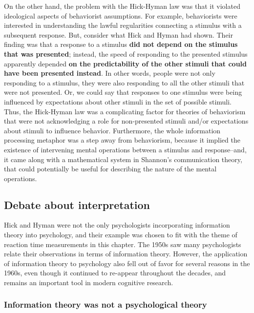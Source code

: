 \documentclass[
  oneside,
  12pt]{crumpbook}
\begin{document}
On the other hand, the problem with the Hick-Hyman law was that it violated ideological aspects of behaviorist assumptions. For example, behaviorists were interested in understanding the lawful regularities connecting a stimulus with a subsequent response. But, consider what Hick and Hyman had shown. Their finding was that a response to a stimulus \textbf{did not depend on the stimulus that was presented}; instead, the speed of responding to the presented stimulus apparently depended \textbf{on the predictability of the other stimuli that could have been presented instead}. In other words, people were not only responding to a stimulus, they were also responding to all the other stimuli that were not presented. Or, we could say that responses to one stimulus were being influenced by expectations about other stimuli in the set of possible stimuli. Thus, the Hick-Hyman law was a complicating factor for theories of behaviorism that were not acknowledging a role for non-presented stimuli and/or expectations about stimuli to influence behavior. Furthermore, the whole information processing metaphor was a step away from behaviorism, because it implied the existence of intervening mental operations between a stimulus and response--and, it came along with a mathematical system in Shannon's communication theory, that could potentially be useful for describing the nature of the mental operations.

\hypertarget{debate-about-interpretation}{%
\subsection{Debate about interpretation}\label{debate-about-interpretation}}

Hick and Hyman were not the only psychologists incorporating information theory into psychology, and their example was chosen to fit with the theme of reaction time measurements in this chapter. The 1950s saw many psychologists relate their observations in terms of information theory. However, the application of information theory to psychology also fell out of favor for several reasons in the 1960s, even though it continued to re-appear throughout the decades, and remains an important tool in modern cognitive research.

\hypertarget{information-theory-was-not-a-psychological-theory}{%
\subsubsection{Information theory was not a psychological theory}\label{information-theory-was-not-a-psychological-theory}}
\end{document}
